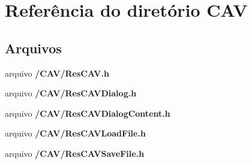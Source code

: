 \section{Referência do diretório C\+AV}
\label{dir_e14899f8ec747fd0108d3ff6de8a6a14}
\subsection*{Arquivos}
\begin{DoxyCompactItemize}
\item 
arquivo {\bf /\+C\+A\+V/\+Res\+C\+A\+V.\+h}
\item 
arquivo {\bf /\+C\+A\+V/\+Res\+C\+A\+V\+Dialog.\+h}
\item 
arquivo {\bf /\+C\+A\+V/\+Res\+C\+A\+V\+Dialog\+Content.\+h}
\item 
arquivo {\bf /\+C\+A\+V/\+Res\+C\+A\+V\+Load\+File.\+h}
\item 
arquivo {\bf /\+C\+A\+V/\+Res\+C\+A\+V\+Save\+File.\+h}
\end{DoxyCompactItemize}
